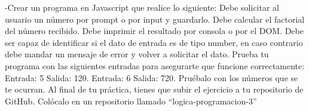 -Crear un programa en Javascript que realice lo siguiente:
Debe solicitar al usuario un número por prompt o por input y guardarlo.
Debe calcular el factorial del número recibido.
Debe imprimir el resultado por consola o por el DOM.
Debe ser capaz de identificar si el dato de entrada es de tipo number, en caso contrario debe mandar un mensaje de error y volver a solicitar el dato.
Prueba tu programa con las siguientes entradas para asegurarte que funcione correctamente:
Entrada: 
5
Salida:
120.
Entrada: 
6
Salida: 
720.
Pruébalo con los números que se te ocurran.
Al final de tu práctica, tienes que subir el ejercicio a tu repositorio de GitHub.
Colócalo en un repositorio llamado “logica-programacion-3”